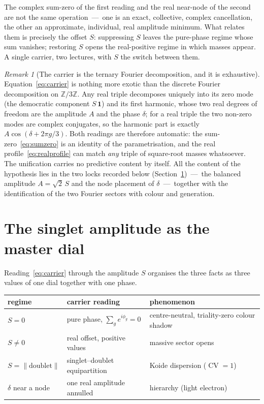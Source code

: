\documentclass[11pt]{article}
\theoremstyle{definition}
\theoremstyle{remark}
\newtheorem{remark}{Remark}
\newcommand{\CV}{\operatorname{CV}}
\begin{document}
    The complex sum-zero of the first reading and the real near-node of the second are not the same operation~---~one
    is an exact, collective, complex cancellation, the other an approximate, individual, real amplitude minimum.
    What relates them is precisely the offset $S$: suppressing $S$ leaves the pure-phase regime whose sum
    vanishes; restoring $S$ opens the real-positive regime in which masses appear.
    A single carrier, two lectures, with $S$ the switch between them.

    \begin{remark}[The carrier is the ternary Fourier decomposition, and it is exhaustive]
      \label{rem:dft}
      Equation~\eqref{eq:carrier} is nothing more exotic than the discrete Fourier decomposition on
      $\mathbb{Z}/3\mathbb{Z}$.
      Any real triple decomposes uniquely into its zero mode (the democratic component $S\,\mathbf 1$) and its
      first harmonic, whose two real degrees of freedom are the amplitude $A$ and the phase $\delta$; for a real
      triple the two non-zero modes are complex conjugates, so the harmonic part is exactly
      $A\cos(\delta + 2\pi g/3)$.
      Both readings are therefore automatic: the sum-zero~\eqref{eq:sumzero} is an identity of the parametrisation,
      and the real profile~\eqref{eq:realprofile} can match \emph{any} triple of square-root masses whatsoever.
      The unification carries no predictive content by itself.
      All the content of the hypothesis lies in the two locks recorded below (Section~\ref{sec:dial})~---~the
      balanced amplitude $A = \sqrt2\,S$ and the node placement of $\delta$~---~together with the identification of
      the two Fourier sectors with colour and generation.
    \end{remark}

  \section{The singlet amplitude as the master dial}
    \label{sec:dial}

    Reading~\eqref{eq:carrier} through the amplitude $S$ organises the three facts as three values of one dial
    together with one phase.

    \begin{center}
      \small
      \begin{tabular}{@{}l l p{}@{}}
        \hline
        regime & carrier reading & phenomenon \\
        \hline
        $S = 0$ & pure phase, $\sum_g e^{i\phi_g} = 0$ & centre-neutral, triality-zero colour shadow \\
        $S \neq 0$ & real offset, positive values & massive sector opens \\
        $S = \lVert\text{doublet}\rVert$ & singlet--doublet equipartition & Koide dispersion ($\CV = 1$) \\
        $\delta$ near a node & one real amplitude annulled & hierarchy (light electron) \\
        \hline
      \end{tabular}
    \end{center}
\end{document}
